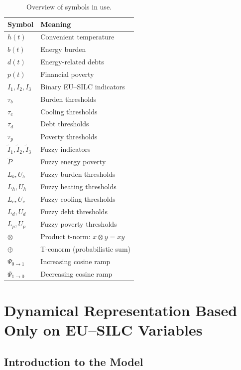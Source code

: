 \documentclass[11pt,a4paper]{article}
\begin{document}
\begin{table}[h!]
\centering
\begin{tabular}{ll}
\toprule
Symbol & Meaning \\
\midrule
$h(t)$ &  Convenient temperature \\
$b(t)$ & Energy burden \\
$d(t)$ & Energy-related debts \\
$p(t)$ & Financial poverty \\
\midrule
$I_1,I_2,I_3$ & Binary EU--SILC indicators \\
$\tau_b$ & Burden thresholds \\
$\tau_c$ & Cooling thresholds \\
$\tau_d$ & Debt  thresholds \\
$\tau_p$ & Poverty thresholds \\
$\tilde I_1,\tilde I_2,\tilde I_3$ & Fuzzy indicators \\
$\tilde P$ & Fuzzy energy poverty \\
$L_b,U_b$ & Fuzzy burden thresholds \\
$L_h,U_h$ & Fuzzy heating thresholds \\
$L_c,U_c$ & Fuzzy cooling thresholds \\
$L_d,U_d$ & Fuzzy debt thresholds \\
$L_p,U_p$ & Fuzzy poverty thresholds \\







\midrule
$\otimes$ & Product t-norm: $x\otimes y = xy$ \\
$\oplus$ & T-conorm (probabilistic sum) \\
$\Psi_{0\to 1}$ & Increasing cosine ramp \\
$\Psi_{1\to 0}$ & Decreasing cosine ramp \\
\bottomrule
\end{tabular}
\caption{Overview of symbols in use.}\label{tab:symbols}
\end{table}

\section{ Dynamical Representation Based Only on EU--SILC Variables}
\subsection{Introduction to the Model}
\end{document}
